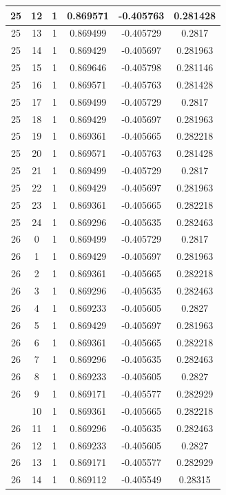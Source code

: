 \documentclass[12pt,a4paper]{article}
\numberwithin{equation}{section}
\numberwithin{figure}{section}
\numberwithin{table}{section}
\begin{document}
\begin{longtable}{|c|c|c|c|c|c|}
25 & 12 & 1 & 0.869571 & -0.405763 & 0.281428 \\ \hline
25 & 13 & 1 & 0.869499 & -0.405729 & 0.2817 \\ \hline
25 & 14 & 1 & 0.869429 & -0.405697 & 0.281963 \\ \hline
25 & 15 & 1 & 0.869646 & -0.405798 & 0.281146 \\ \hline
25 & 16 & 1 & 0.869571 & -0.405763 & 0.281428 \\ \hline
25 & 17 & 1 & 0.869499 & -0.405729 & 0.2817 \\ \hline
25 & 18 & 1 & 0.869429 & -0.405697 & 0.281963 \\ \hline
25 & 19 & 1 & 0.869361 & -0.405665 & 0.282218 \\ \hline
25 & 20 & 1 & 0.869571 & -0.405763 & 0.281428 \\ \hline
25 & 21 & 1 & 0.869499 & -0.405729 & 0.2817 \\ \hline
25 & 22 & 1 & 0.869429 & -0.405697 & 0.281963 \\ \hline
25 & 23 & 1 & 0.869361 & -0.405665 & 0.282218 \\ \hline
25 & 24 & 1 & 0.869296 & -0.405635 & 0.282463 \\ \hline
26 & 0 & 1 & 0.869499 & -0.405729 & 0.2817 \\ \hline
26 & 1 & 1 & 0.869429 & -0.405697 & 0.281963 \\ \hline
26 & 2 & 1 & 0.869361 & -0.405665 & 0.282218 \\ \hline
26 & 3 & 1 & 0.869296 & -0.405635 & 0.282463 \\ \hline
26 & 4 & 1 & 0.869233 & -0.405605 & 0.2827 \\ \hline
26 & 5 & 1 & 0.869429 & -0.405697 & 0.281963 \\ \hline
26 & 6 & 1 & 0.869361 & -0.405665 & 0.282218 \\ \hline
26 & 7 & 1 & 0.869296 & -0.405635 & 0.282463 \\ \hline
26 & 8 & 1 & 0.869233 & -0.405605 & 0.2827 \\ \hline
26 & 9 & 1 & 0.869171 & -0.405577 & 0.282929 \\ \hline
\pagebreak
26 & 10 & 1 & 0.869361 & -0.405665 & 0.282218 \\ \hline
26 & 11 & 1 & 0.869296 & -0.405635 & 0.282463 \\ \hline
26 & 12 & 1 & 0.869233 & -0.405605 & 0.2827 \\ \hline
26 & 13 & 1 & 0.869171 & -0.405577 & 0.282929 \\ \hline
26 & 14 & 1 & 0.869112 & -0.405549 & 0.28315 \\ \hline

\end{longtable}
\end{document}
